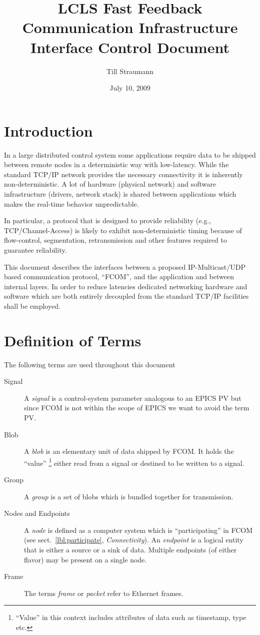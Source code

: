 \documentclass[11pt]{article}
\title{LCLS Fast Feedback Communication Infrastructure Interface Control Document}
\author{Till Straumann}
\date{July 10, 2009}
\newcommand{\fcom}{FCOM}
\newcommand{\blob}{blob}
\newcommand{\Blob}{Blob}
\newcommand{\group}{group}
\newcommand{\Group}{Group}
\newcommand{\signal}{signal}
\newcommand{\Signal}{Signal}
\begin{document}
\maketitle
\section{Introduction}
In a large distributed control system some applications
require data to be shipped between remote nodes in a
deterministic way with low-latency. While the standard
TCP/IP network provides the necessary connectivity
it is inherently non-deterministic. A lot of hardware
(physical network) and software infrastructure (drivers,
network stack) is shared between applications which makes
the real-time behavior unpredictable.

In particular, a protocol that is designed to 
provide reliability (e.g., TCP/Channel-Access) 
is likely to exhibit non-deterministic timing
because of flow-control, segmentation, retransmission
and other features required to guarantee reliability.

This document describes the interfaces between
a proposed IP-Multicast/UDP based communication protocol,
``\fcom{}'', and the application 
and between internal layers. In order to reduce latencies
dedicated networking hardware and software which are both
entirely decoupled from the standard TCP/IP facilities
shall be employed.

\section{Definition of Terms}
The following terms are used throughout this document
\begin{description}

\item[\Signal]
   A {\em \signal} is a control-system parameter analogous
   to an EPICS PV but since \fcom{} is not within the
   scope of EPICS we want to avoid the term PV.
\item[\Blob]
   A {\em \blob} is an elementary unit of data shipped
   by \fcom{}. It holds the ``value''%
\footnote{
   ``Value'' in this context includes attributes of
   data such as timestamp, type etc.
}
   either read from
   a \signal{} or destined to be written to a \signal{}.
\item[\Group]
   A {\em \group} is a set of \blob{}s which is bundled
   together for transmission.
\item[Nodes and Endpoints]
   A {\em node} is defined as a computer
   system which is ``participating'' in \fcom{}
   (see sect.~\ref{lbl:participate}, {\em Connectivity}).
   An {\em endpoint} is a logical entity
   that is either a source or a sink of data. Multiple
   endpoints (of either flavor) may be present on a
   single node.
\item[Frame]
   The terms {\em frame} or {\em packet} refer to
   Ethernet frames.
\end{description}
\end{document}
